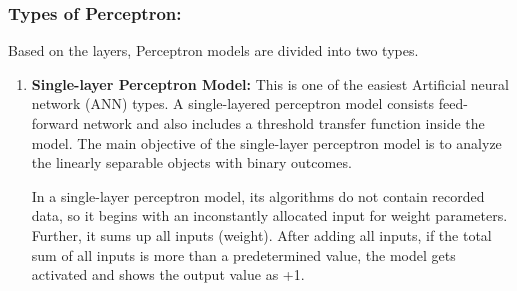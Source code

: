 \subsubsection{Types of Perceptron:}
Based on the layers, Perceptron models are divided into two types.
\begin{enumerate}
    \item \textbf{Single-layer Perceptron Model: } This is one of the easiest Artificial neural network (ANN) types. A single-layered perceptron model consists feed-forward network and also includes a threshold transfer function inside the model. The main objective of the single-layer perceptron model is to analyze the linearly separable objects with binary outcomes.

    In a single-layer perceptron model, its algorithms do not contain recorded data, so it begins with an inconstantly allocated input for weight parameters. Further, it sums up all inputs (weight). After adding all inputs, if the total sum of all inputs is more than a predetermined value, the model gets activated and shows the output value as +1.
    

\end{enumerate}
